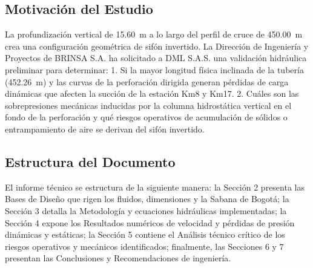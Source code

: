 \subsection{Motivación del Estudio}
\label{ssec:intro_motivacion}

La profundización vertical de \SI{15.60}{\meter} a lo largo del perfil de cruce de \SI{450.00}{\meter} crea una configuración geométrica de sifón invertido. La Dirección de Ingeniería y Proyectos de BRINSA S.A. ha solicitado a DML S.A.S. una validación hidráulica preliminar para determinar:
1. Si la mayor longitud física inclinada de la tubería (\SI{452.26}{\meter}) y las curvas de la perforación dirigida generan pérdidas de carga dinámicas que afecten la succión de la estación Km8 y Km17.
2. Cuáles son las sobrepresiones mecánicas inducidas por la columna hidrostática vertical en el fondo de la perforación y qué riesgos operativos de acumulación de sólidos o entrampamiento de aire se derivan del sifón invertido.

\subsection{Estructura del Documento}
\label{ssec:intro_estructura}

El informe técnico se estructura de la siguiente manera: la Sección 2 presenta las Bases de Diseño que rigen los fluidos, dimensiones y la Sabana de Bogotá; la Sección 3 detalla la Metodología y ecuaciones hidráulicas implementadas; la Sección 4 expone los Resultados numéricos de velocidad y pérdidas de presión dinámicas y estáticas; la Sección 5 contiene el Análisis técnico crítico de los riesgos operativos y mecánicos identificados; finalmente, las Secciones 6 y 7 presentan las Conclusiones y Recomendaciones de ingeniería.
